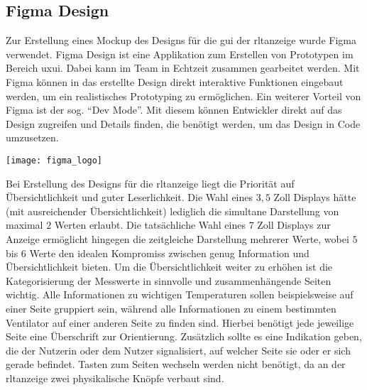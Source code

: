 \subsection{Figma Design}\label{figma_design}
\begin{minipage}{0.6\textwidth}
    Zur Erstellung eines Mockup des Designs für die \acs{gui} der \acs{rltanzeige} wurde Figma verwendet. Figma Design ist eine Applikation zum Erstellen von Prototypen im Bereich \ac{uxui}. Dabei kann im Team in Echtzeit zusammen gearbeitet werden. Mit Figma können in das erstellte Design direkt interaktive Funktionen eingebaut werden, um ein realistisches Prototyping zu ermöglichen. Ein weiterer Vorteil von Figma ist der sog. \enquote{Dev Mode}. Mit diesem können Entwickler direkt auf das Design zugreifen und Details finden, die benötigt werden, um das Design in Code umzusetzen. \cite[vgl.][]{figma_design:o.J.}
\end{minipage}%
\hfill
\begin{minipage}{0.37\textwidth}
	\centering	
	\texttt{[image: figma\_logo]}
\end{minipage}
\vspace{1ex}

Bei Erstellung des Designs für die \acs{rltanzeige} liegt die Priorität auf Übersichtlichkeit und guter Leserlichkeit. Die Wahl eines $3,5$ Zoll Displays hätte (mit ausreichender Übersichtlichkeit) lediglich die simultane Darstellung von maximal $2$ Werten erlaubt. Die tatsächliche Wahl eines $7$ Zoll Displays zur Anzeige ermöglicht hingegen die zeitgleiche Darstellung mehrerer Werte, wobei $5$ bis $6$ Werte den idealen Kompromiss zwischen genug Information und Übersichtlichkeit bieten. Um die Übersichtlichkeit weiter zu erhöhen ist die Kategorisierung der Messwerte in sinnvolle und zusammenhängende Seiten wichtig. Alle Informationen zu wichtigen Temperaturen sollen beispielsweise auf einer Seite gruppiert sein, während alle Informationen zu einem bestimmten Ventilator auf einer anderen Seite zu finden sind. Hierbei benötigt jede jeweilige Seite eine Überschrift zur Orientierung. Zusätzlich sollte es eine Indikation geben, die der Nutzerin oder dem Nutzer signalisiert, auf welcher Seite sie oder er sich gerade befindet. Tasten zum Seiten wechseln werden nicht benötigt, da an der \acs{rltanzeige} zwei physikalische Knöpfe verbaut sind.

